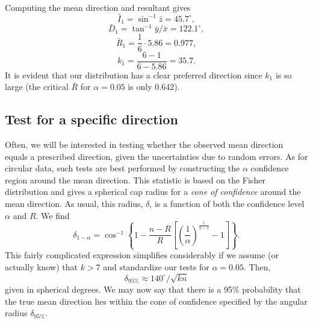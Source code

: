\begin{example}
$$$$
Computing the mean direction and resultant gives
\begin{equation}
\bar{I}_1 = \sin ^{-1} \bar{z} = 45.7^{\circ},
\end{equation}
\begin{equation}
\bar{D}_1 = \tan^{-1} \bar{y} / \bar{x} = 122.1^{\circ},
\end{equation}
\begin{equation}
\bar{R}_1 = \frac{1}{6} \cdot 5.86 = 0.977,
\end{equation}
\begin{equation}
k_1 = \frac{6-1}{6-5.86} = 35.7.
\end{equation}	 
It is evident that our distribution has a clear preferred direction since $k_1$ is so large (the critical
$\bar{R}$ for $\alpha = 0.05$ is only 0.642).
\end{example}

\subsection{Test for a specific direction}

Often, we will be interested in testing whether the observed mean direction equals a 
prescribed direction, given the uncertainties due to random errors.  As for circular data, such tests
are best performed by constructing the $\alpha$ confidence region around the mean direction.  This
statistic is based on the Fisher distribution and gives a spherical cap radius for a \emph{cone of confidence}
around the mean direction.  As usual, this radius, $\delta$, is a function of both the confidence level $\alpha$ and $R$.  
We find
\begin{equation}
\delta_{1- \alpha} = \cos^{-1} \left \{1- \frac{n-R}{R} \left[ \left (\frac{1}{ \alpha}\right )^{ \frac{1}{n-1}}-1 \right] \right \}.
\label{eq:exactconer}
\end{equation}
This fairly complicated expression simplifies considerably if we assume (or actually know) that $k > 7$ and
standardize our tests for $\alpha = 0.05$.  Then, 
\begin{equation}
\delta_{95\%} \approx 140^\circ /\sqrt{kn}
\label{eq:cone95}
\end{equation}
given in spherical degrees.  We may now say that there is a 95\% probability that the true mean direction lies within the cone of 
confidence specified by the angular radius $\delta_{95\%}$.

